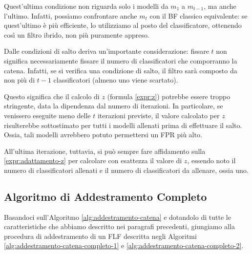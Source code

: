 Quest'ultima condizione non riguarda solo i modelli da $m_1$ a $m_{t-1}$, ma anche l'ultimo. Infatti, possiamo confrontare anche $m_t$ con il BF classico equivalente: se quest'ultimo è più efficiente, lo utilizziamo al posto del classificatore, ottenendo così un filtro ibrido, non più puramente appreso.

Dalle condizioni di salto deriva un'importante considerazione: fissare $t$ non significa necessariamente fissare il numero di classificatori che comporranno la catena. Infatti, se si verifica una condizione di salto, il filtro sarà composto da non più di $t-1$ classificatori (almeno uno viene scartato).

Questo significa che il calcolo di $z$ (formula \eqref{expr:z}) potrebbe essere troppo stringente, data la dipendenza dal numero di iterazioni. In particolare, se venissero eseguite meno delle $t$ iterazioni previste, il valore calcolato per $z$ risulterebbe sottostimato per tutti i modelli allenati prima di effettuare il salto. Ossia, tali modelli avrebbero potuto permettersi un FPR più alto.

All'ultima iterazione, tuttavia, si può sempre fare affidamento sulla \eqref{expr:adattamento-z} per calcolare con esattezza il valore di $z$, essendo noto il numero di classificatori allenati e il numero di classificatori da allenare, ossia uno.



\subsection{Algoritmo di Addestramento Completo}

Basandoci sull'Algoritmo \ref{alg:addestramento-catena} e dotandolo di tutte le caratteristiche che abbiamo descritto nei paragrafi precedenti, giungiamo alla procedura di addestramento di un FLF descritta negli Algoritmi \ref{alg:addestramento-catena-completo-1} e \ref{alg:addestramento-catena-completo-2}.

